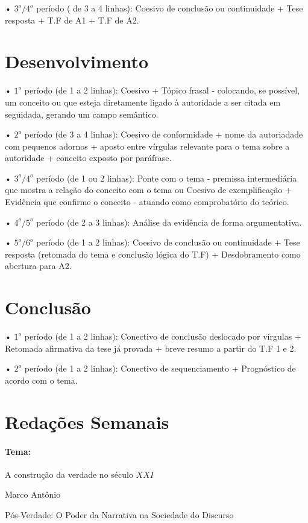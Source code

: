 \documentclass{article}
\begin{document}
• $3^o/4^o$ período ( de 3 a 4 linhas): Coesivo de conclusão ou continuidade + Tese resposta + T.F de A1 + T.F de A2.
\section*{Desenvolvimento}
 • $1^o$ período (de 1 a 2 linhas): Coesivo + Tópico frasal - colocando, se possível, um conceito ou  que esteja diretamente ligado à autoridade a ser citada em seguidada, gerando um campo semântico.


• $2^o$ período (de 3 a 4 linhas): Coesivo de conformidade + nome da autoriadade com pequenos adornos + aposto entre vírgulas relevante para o tema sobre a autoridade + conceito exposto por paráfrase.


• $3^o/4^o$ período (de 1 ou 2 linhas): Ponte com o tema  - premissa intermediária que mostra a relação do conceito com o tema    ou 
             Coesivo de exemplificação + Evidência que confirme o conceito - atuando como                      comprobatório do teórico.


• $4^o/5^o$ período (de 2 a 3 linhas): Análise da evidência de forma argumentativa.


• $5^o/6^o$ período (de 1 a 2 linhas): Coesivo de conclusão ou continuidade + Tese resposta (retomada do tema e conclusão lógica do T.F) + Desdobramento como abertura para A2. 

\section*{Conclusão}
• $1^o$ período (de 1 a 2 linhas): Conectivo de conclusão deslocado por vírgulas + Retomada afirmativa da tese já provada + breve resumo a partir do T.F 1 e 2.


• $2^o$ período (de 1 a 2 linhas): Conectivo de 
sequenciamento + Prognóstico de acordo com o tema.

\newpage
\section*{Redações Semanais} \paragraph{Tema:} A construção da verdade no século $XXI$

\begin{flushright} Marco Antônio \end{flushright}
Pós-Verdade: O Poder da Narrativa na Sociedade do Discurso
\end{document}
